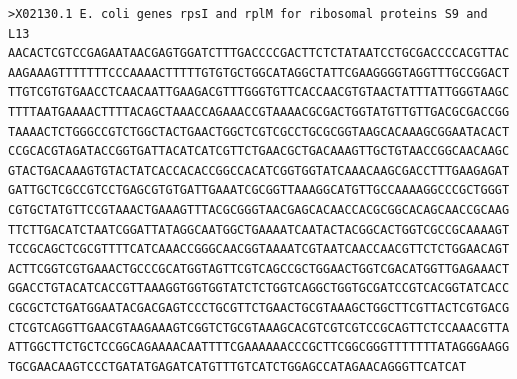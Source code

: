 \documentclass[
]{book}
\begin{document}
\begin{verbatim}
>X02130.1 E. coli genes rpsI and rplM for ribosomal proteins S9 and L13
AACACTCGTCCGAGAATAACGAGTGGATCTTTGACCCCGACTTCTCTATAATCCTGCGACCCCACGTTAC
AAGAAAGTTTTTTTCCCAAAACTTTTTGTGTGCTGGCATAGGCTATTCGAAGGGGTAGGTTTGCCGGACT
TTGTCGTGTGAACCTCAACAATTGAAGACGTTTGGGTGTTCACCAACGTGTAACTATTTATTGGGTAAGC
TTTTAATGAAAACTTTTACAGCTAAACCAGAAACCGTAAAACGCGACTGGTATGTTGTTGACGCGACCGG
TAAAACTCTGGGCCGTCTGGCTACTGAACTGGCTCGTCGCCTGCGCGGTAAGCACAAAGCGGAATACACT
CCGCACGTAGATACCGGTGATTACATCATCGTTCTGAACGCTGACAAAGTTGCTGTAACCGGCAACAAGC
GTACTGACAAAGTGTACTATCACCACACCGGCCACATCGGTGGTATCAAACAAGCGACCTTTGAAGAGAT
GATTGCTCGCCGTCCTGAGCGTGTGATTGAAATCGCGGTTAAAGGCATGTTGCCAAAAGGCCCGCTGGGT
CGTGCTATGTTCCGTAAACTGAAAGTTTACGCGGGTAACGAGCACAACCACGCGGCACAGCAACCGCAAG
TTCTTGACATCTAATCGGATTATAGGCAATGGCTGAAAATCAATACTACGGCACTGGTCGCCGCAAAAGT
TCCGCAGCTCGCGTTTTCATCAAACCGGGCAACGGTAAAATCGTAATCAACCAACGTTCTCTGGAACAGT
ACTTCGGTCGTGAAACTGCCCGCATGGTAGTTCGTCAGCCGCTGGAACTGGTCGACATGGTTGAGAAACT
GGACCTGTACATCACCGTTAAAGGTGGTGGTATCTCTGGTCAGGCTGGTGCGATCCGTCACGGTATCACC
CGCGCTCTGATGGAATACGACGAGTCCCTGCGTTCTGAACTGCGTAAAGCTGGCTTCGTTACTCGTGACG
CTCGTCAGGTTGAACGTAAGAAAGTCGGTCTGCGTAAAGCACGTCGTCGTCCGCAGTTCTCCAAACGTTA
ATTGGCTTCTGCTCCGGCAGAAAACAATTTTCGAAAAAACCCGCTTCGGCGGGTTTTTTTATAGGGAAGG
TGCGAACAAGTCCCTGATATGAGATCATGTTTGTCATCTGGAGCCATAGAACAGGGTTCATCAT


\end{verbatim}
\end{document}
